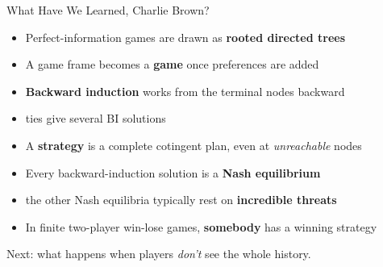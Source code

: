 

\begin{frame}{What Have We Learned, Charlie Brown?}
\begin{itemize}
    \item Perfect-information games are drawn as \textbf{rooted directed trees}
    \item A game frame becomes
      a \textbf{game} once preferences are added
    \item \textbf{Backward induction} works from the terminal nodes backward
    \item ties give several BI
      solutions
    \item A \textbf{strategy} is a complete cotingent plan, even at \textit{unreachable} nodes
    \item Every backward-induction solution is a \textbf{Nash equilibrium}
    \item the other
      Nash equilibria typically rest on \textbf{incredible threats}
    \item In finite two-player win-lose games, \textbf{somebody} has a winning strategy
\end{itemize}
\vfill
Next: what happens when players \textit{don't} see the whole history.
\vspace{-0.4in}
\end{frame}


